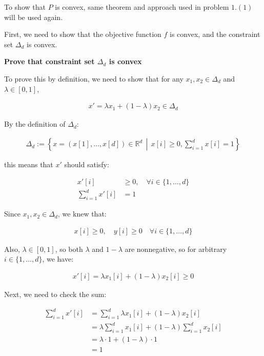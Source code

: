\documentclass{article}
\begin{document}
To show that $P$ is convex, same theorem and approach used in problem $1. (1)$ will be used again.
\bigskip

First, we need to show that the objective function $f$ is convex, and the constraint set $\Delta_d$ is convex.

\begin{center}
    \textbf{Prove that constraint set $\Delta_d$ is convex}
\end{center}

To prove this by definition, 
we need to show that for any $x_1, x_2 \in \Delta_d$ and $\lambda \in [0, 1]$,

\begin{align*}
    x' = \lambda x_1 + (1 - \lambda) x_2 \in \Delta_d
\end{align*}

By the definition of $\Delta_d$:

\begin{align*}
    \Delta_d := \left\{ x = ( x[1], \ldots, x[d] ) \in \mathbb{R}^d \, \middle| \, x[i] \geq 0, \sum_{i = 1}^d x[i] = 1 \right\} 
\end{align*}

this means that $x'$ should satisfy:

\begin{align*}
    x'[i] &\geq 0, \quad \forall i \in \{1, \ldots, d\} \\
    \sum_{i = 1}^d x'[i] &= 1
\end{align*}

Since $x_1, x_2 \in \Delta_d$, we knew that:

\begin{align*}
x[i] \geq 0, \quad y[i] \geq 0 \quad \forall i \in \{1, \dots, d\}
\end{align*}

Also, $\lambda \in [0, 1]$, so both $\lambda$ and $1 - \lambda$ are nonnegative, 
so for arbitrary $i \in \{1, \ldots, d\}$, we have:

\begin{align*}
    x'[i] = \lambda x_1[i] + (1 - \lambda) x_2[i] \geq 0
\end{align*}

Next, we need to check the sum:

\begin{align*}
    \sum_{i = 1}^d x'[i] 
    &= \sum_{i = 1}^d \lambda x_1[i] + (1 - \lambda) x_2[i] \\
    &= \lambda \sum_{i = 1}^d x_1[i] + (1 - \lambda) \sum_{i = 1}^d x_2[i] \\
    &= \lambda \cdot 1 + (1 - \lambda) \cdot 1 \\
    &= 1
\end{align*}
\end{document}
